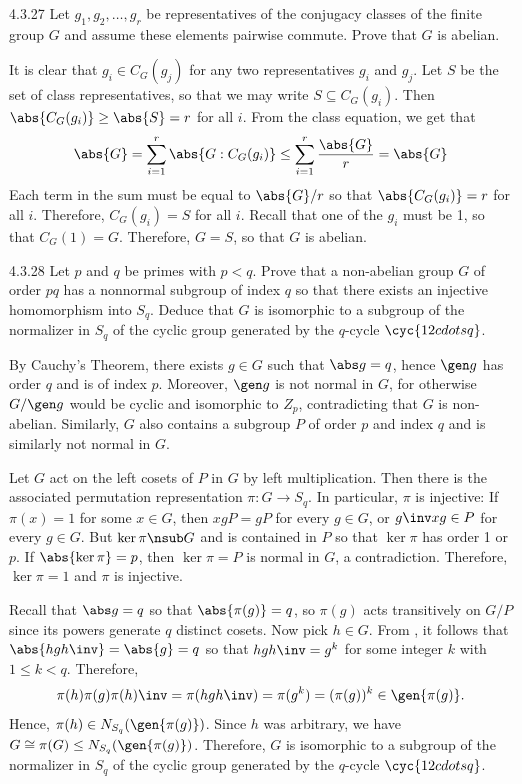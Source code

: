 \begin{exercise}{4.3.27}
	Let $g_1, g_2, \ldots, g_r$ be representatives of the conjugacy classes of the finite group $G$ and assume these elements pairwise commute.
	Prove that $G$ is abelian.
\end{exercise}

\begin{sol}
	It is clear that $g_i \in C_G(g_j)$ for any two representatives $g_i$ and $g_j$.
	Let $S$ be the set of class representatives, so that we may write $S \subseteq C_G(g_i)$.
	Then $\abs{C_G(g_i)} \geq \abs{S} = r$ for all $i$.
	From the class equation, we get that
	\[
		\abs{G} = \sum_{i = 1}^r \abs{G : C_G(g_i)} \leq \sum_{i = 1}^r \frac{\abs{G}}{r} = \abs{G}
	\]
	Each term in the sum must be equal to $\abs{G}/r$ so that $\abs{C_G(g_i)} = r$ for all $i$.
	Therefore, $C_G(g_i) = S$ for all $i$.
	Recall that one of the $g_i$ must be 1, so that $C_G(1) = G$.
	Therefore, $G = S$, so that $G$ is abelian.
\end{sol}

\begin{exercise}{4.3.28}
	Let $p$ and $q$ be primes with $p < q$.
	Prove that a non-abelian group $G$ of order $pq$ has a nonnormal subgroup of index $q$ so that there exists an injective homomorphism into $S_q$.
	Deduce that $G$ is isomorphic to a subgroup of the normalizer in $S_q$ of the cyclic group generated by the $q$-cycle $\cyc{1 2 cdots q}$.
\end{exercise}

\begin{sol}
	By Cauchy's Theorem, there exists $g \in G$ such that $\abs g = q$, hence $\gen g$ has order $q$ and is of index $p$.
	Moreover, $\gen g$ is not normal in $G$, for otherwise $G/\gen g$ would be cyclic and isomorphic to $Z_p$, contradicting that $G$ is non-abelian.
	Similarly, $G$ also contains a subgroup $P$ of order $p$ and index $q$ and is similarly not normal in $G$.

	Let $G$ act on the left cosets of $P$ in $G$ by left multiplication.
	Then there is the associated permutation representation $\pi \colon G \to S_q$.
	In particular, $\pi$ is injective: If $\pi(x) = 1$ for some $x \in G$, then $xgP = gP$ for every $g \in G$, or $g\inv xg \in P$ for every $g \in G$.
	But $\ker\pi \nsub G$ and is contained in $P$ so that $\ker\pi$ has order 1 or $p$.
	If $\abs{\ker\pi} = p$, then $\ker\pi = P$ is normal in $G$, a contradiction.
	Therefore, $\ker\pi = 1$ and $\pi$ is injective.

	Recall that $\abs g = q$ so that $\abs{\pi(g)} = q$, so $\pi(g)$ acts transitively on $G/P$ since its powers generate $q$ distinct cosets.
	Now pick $h \in G$.
	From , it follows that $\abs{hgh\inv} = \abs{g} = q$ so that $hgh\inv = g^k$ for some integer $k$ with $1 \leq k < q$.
	Therefore,
	\[
		\pi(h)\pi(g)\pi(h)\inv = \pi(hgh\inv) = \pi(g^k) = (\pi(g))^k \in \gen{\pi(g)}.
	\]
	Hence, $\pi(h) \in N_{S_q}(\gen{\pi(g)})$.
	Since $h$ was arbitrary, we have $G \cong \pi(G) \leq N_{S_q}(\gen{\pi(g)})$.
	Therefore, $G$ is isomorphic to a subgroup of the normalizer in $S_q$ of the cyclic group generated by the $q$-cycle $\cyc{1 2 cdots q}$.
\end{sol}

